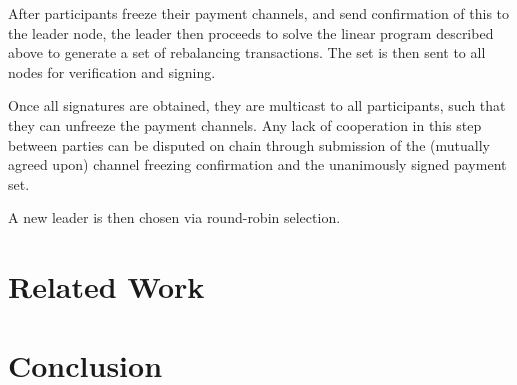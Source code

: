 \documentclass[12pt]{article}
\newcommand{\todo}[1]{{\color{red}\ TODO: {#1}}}
\begin{document}
After participants freeze their payment channels, and send confirmation of this to the leader node, the leader then proceeds to solve the linear program described above to generate a set of rebalancing transactions. The set is then sent to all nodes for verification and signing.

Once all signatures are obtained, they are multicast to all participants, such that they can unfreeze the payment channels. Any lack of cooperation in this step between parties can be disputed on chain through submission of the (mutually agreed upon) channel freezing confirmation and the unanimously signed payment set.

A new leader is then chosen via round-robin selection.








\section{Related Work}
\section{Conclusion}



\end{document}
